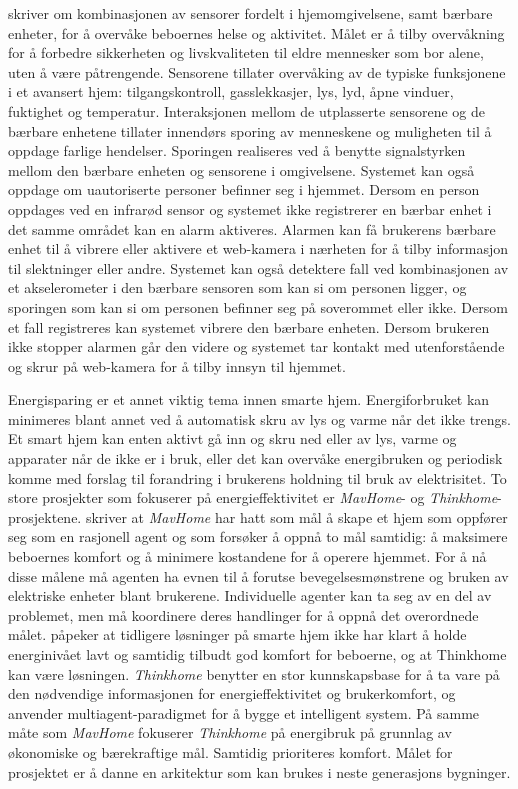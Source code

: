 \citet{casattenta} skriver om kombinasjonen av sensorer fordelt i hjemomgivelsene, samt bærbare enheter, for å overvåke beboernes helse og aktivitet. Målet er å tilby overvåkning for å forbedre sikkerheten og livskvaliteten til eldre mennesker som bor alene, uten å være påtrengende. Sensorene tillater overvåking av de typiske funksjonene i et avansert hjem: tilgangskontroll, gasslekkasjer, lys, lyd, åpne vinduer, fuktighet og temperatur. Interaksjonen mellom de utplasserte sensorene og de bærbare enhetene tillater innendørs sporing av menneskene og muligheten til å oppdage farlige hendelser. Sporingen realiseres ved å benytte signalstyrken mellom den bærbare enheten og sensorene i omgivelsene. Systemet kan også oppdage om uautoriserte personer befinner seg i hjemmet. Dersom en person oppdages ved en infrarød sensor og systemet ikke registrerer en bærbar enhet i det samme området kan en alarm aktiveres. Alarmen kan få brukerens bærbare enhet til å vibrere eller aktivere et web-kamera i nærheten for å tilby informasjon til slektninger eller andre. Systemet kan også detektere fall ved kombinasjonen av et akselerometer i den bærbare sensoren som kan si om personen ligger, og sporingen som kan si om personen befinner seg på soverommet eller ikke. Dersom et fall registreres kan systemet vibrere den bærbare enheten. Dersom brukeren ikke stopper alarmen går den videre og systemet tar kontakt med utenforstående og skrur på web-kamera for å tilby innsyn til hjemmet.

Energisparing er et annet viktig tema innen smarte hjem. Energiforbruket kan minimeres blant annet ved å automatisk skru av lys og varme når det ikke trengs. Et smart hjem kan enten aktivt gå inn og skru ned eller av lys, varme og apparater når de ikke er i bruk, eller det kan overvåke energibruken og periodisk komme med forslag til forandring i brukerens holdning til bruk av elektrisitet. To store prosjekter som fokuserer på energieffektivitet er \emph{MavHome}- og \emph{Thinkhome}-prosjektene. \citet{mavhome} skriver at \emph{MavHome} har hatt som mål å skape et hjem som oppfører seg som en rasjonell agent og som forsøker å oppnå to mål samtidig: å maksimere beboernes komfort og å minimere kostandene for å operere hjemmet. For å nå disse målene må agenten ha evnen til å forutse bevegelsesmønstrene og bruken av elektriske enheter blant brukerene. Individuelle agenter kan ta seg av en del av problemet, men må koordinere deres handlinger for å oppnå det overordnede målet. \citet{thinkhome} påpeker at tidligere løsninger på smarte hjem ikke har klart å holde energinivået lavt og samtidig tilbudt god komfort for beboerne, og at Thinkhome kan være løsningen. \emph{Thinkhome} benytter en stor kunnskapsbase for å ta vare på den nødvendige informasjonen for energieffektivitet og brukerkomfort, og anvender multiagent-paradigmet for å bygge et intelligent system. På samme måte som \emph{MavHome} fokuserer \emph{Thinkhome} på energibruk på grunnlag av økonomiske og bærekraftige mål. Samtidig prioriteres komfort. Målet for prosjektet er å danne en arkitektur som kan brukes i neste generasjons bygninger.

